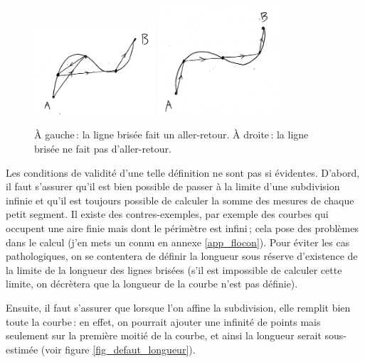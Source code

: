 	\begin{figure}
		\includegraphics[width=0.4\textwidth]{image/pi_nombre/aller_retour2.jpg}
        \hfill 
        \includegraphics[width=0.4\textwidth]{image/pi_nombre/aller_retour1.jpg}
		\caption{À gauche\,: la ligne brisée fait un aller-retour. À droite\,: la ligne brisée ne fait pas d'aller-retour.}
		\label{fig_aller_retour}
	\end{figure}


	Les conditions de validité d'une telle définition ne sont pas si évidentes. D'abord, il faut s'assurer qu'il est bien possible de passer à la limite d'une subdivision infinie et qu'il est toujours possible de calculer la somme des mesures de chaque petit segment. Il existe des contres-exemples, par exemple des courbes qui occupent une aire finie mais dont le périmètre est infini\,; cela pose des problèmes dans le calcul (j'en mets un connu en annexe \ref{app_flocon}). Pour éviter les cas pathologiques, on se contentera de définir la longueur sous réserve d'existence de la limite de la longueur des lignes brisées (s'il est impossible de calculer cette limite, on décrètera que la longueur de la courbe n'est pas définie). 

	Ensuite, il faut s'assurer que lorsque l'on affine la subdivision, elle remplit bien toute la courbe\,: en effet, on pourrait ajouter une infinité de points mais seulement sur la première moitié de la courbe, et ainsi la longueur serait sous-estimée (voir figure \ref{fig_defaut_longueur}). 


